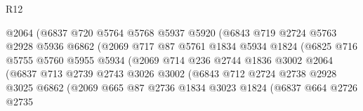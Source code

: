 \begin{lexlean}{R12}
\begin{coremodule}
                              @2064
                              (@6837
                                @720
                                @5764
                                @5768
                                @5937
                                @5920
                                (@6843
                                  @719
                                  @2724
                                  @5763
                                  @2928
                                  @5936
                                  @6862
                                  (@2069
                                    @717
                                    @87
                                    @5761
                                    @1834
                                    @5934
                                    @1824
                                    (@6825
                                      @716
                                      @5755
                                      @5760
                                      @5955
                                      @5934
                                      (@2069
                                        @714
                                        @236
                                        @2744
                                        @1836
                                        @3002
                                        @2064
                                        (@6837
                                          @713
                                          @2739
                                          @2743
                                          @3026
                                          @3002
                                          (@6843
                                            @712
                                            @2724
                                            @2738
                                            @2928
                                            @3025
                                            @6862
                                            (@2069
                                              @665
                                              @87
                                              @2736
                                              @1834
                                              @3023
                                              @1824
                                              (@6837
                                                @664
                                                @2726
                                                @2735

\end{coremodule}
\end{lexlean}
